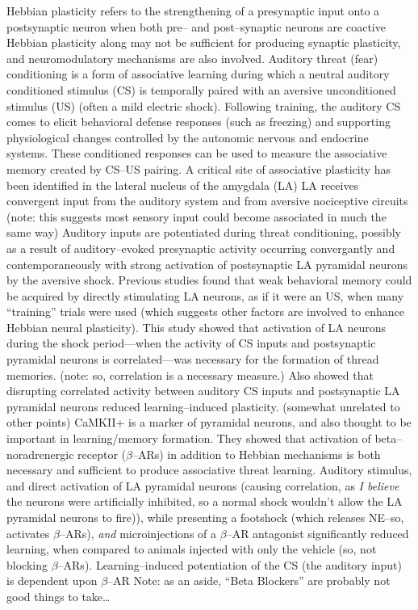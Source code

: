 \documentclass[11pt, a4paper, oneside]{article}   	%
\begin{document}
\begin{outline}
    \point Hebbian plasticity refers to the strengthening of a presynaptic input onto a postsynaptic neuron when both pre-- and post--synaptic neurons are coactive
        \subpoint Hebbian plasticity along may not be sufficient for producing synaptic plasticity, and neuromodulatory mechanisms are also involved.
    \point Auditory threat (fear) conditioning is a form of associative learning during which a neutral auditory conditioned stimulus (CS) is temporally paired with an aversive unconditioned stimulus (US) (often a mild electric shock). Following training, the auditory CS comes to elicit behavioral defense responses (such as freezing) and supporting physiological changes controlled by the autonomic nervous and endocrine systems.
        \subpoint These conditioned responses can be used to measure the associative memory created by CS--US pairing.
    \point A critical site of associative plasticity has been identified in the lateral nucleus of the amygdala (LA)
        \subpoint LA receives convergent input from the auditory system and from aversive nociceptive circuits (note: this suggests most sensory input could become associated in much the same way)
    \point Auditory inputs are potentiated during threat conditioning, possibly as a result of auditory--evoked presynaptic activity occurring convergantly and contemporaneously with strong activation of postsynaptic LA pyramidal neurons by the aversive shock.
    \point Previous studies found that weak behavioral memory could be acquired by directly stimulating LA neurons, as if it were an US, when many ``training'' trials were used (which suggests other factors are involved to enhance Hebbian neural plasticity). 
    \point This study showed that activation of LA neurons during the shock period---when the activity of CS inputs and postsynaptic pyramidal neurons is correlated---was necessary for the formation of thread memories. (note: so, correlation is a necessary measure.)
        \subpoint Also showed that disrupting correlated activity between auditory CS inputs and postsynaptic LA pyramidal neurons reduced learning--induced plasticity.
    \point (somewhat unrelated to other points) CaMKII+ is a marker of pyramidal neurons, and also thought to be important in learning/memory formation.
    \point They showed that activation of beta--noradrenergic receptor ($\beta$--ARs) in addition to Hebbian mechanisms is both necessary and sufficient to produce associative threat learning.
    \subpoint Auditory stimulus, and direct activation of LA pyramidal neurons (causing correlation, as \textit{I believe} the neurons were artificially inhibited, so a normal shock wouldn't allow the LA pyramidal neurons to fire)), while presenting a footshock (which releases NE--so, activates $\beta$--ARs), \textit{and} microinjections of a $\beta$--AR antagonist significantly reduced learning, when compared to animals injected with only the vehicle (so, not blocking $\beta$--ARs). 
        \subpoint Learning--induced potentiation of the CS (the auditory input) is dependent upon $\beta$--AR
            \subsubpoint Note: as an aside, ``Beta Blockers'' are probably not good things to take\ldots

\end{outline}
\end{document}

